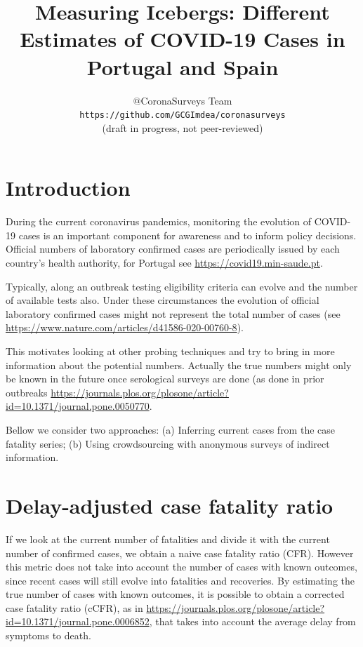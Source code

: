 \documentclass{article}
\begin{document}
\title{Measuring Icebergs: Different Estimates of COVID-19 Cases in Portugal and Spain}
\author{$@$CoronaSurveys Team \\ \texttt{https://github.com/GCGImdea/coronasurveys}\\(draft in progress, not peer-reviewed)}
\maketitle
\section{Introduction}

During the current coronavirus pandemics, monitoring the evolution of COVID-19 cases is an important component for awareness and to inform policy decisions. 
Official numbers of laboratory confirmed cases are periodically issued by each country's health authority, for Portugal see \url{https://covid19.min-saude.pt}. 

Typically, along an outbreak testing eligibility criteria can evolve and the number of available tests also. Under these circumstances the evolution of official laboratory confirmed cases might not represent the total number of cases (see \url{https://www.nature.com/articles/d41586-020-00760-8}).  

This motivates looking at other probing techniques and try to bring in more information about the potential numbers. Actually the true numbers might only be known in the future once serological surveys are done (as done in prior outbreaks \url{https://journals.plos.org/plosone/article?id=10.1371/journal.pone.0050770}.

Bellow we consider two approaches: (a) Inferring current cases from the case fatality series; (b) Using crowdsourcing with anonymous surveys of indirect information.  

\section{Delay-adjusted case fatality ratio}

If we look at the current number of fatalities and divide it with the current number of confirmed cases, we obtain a naive case fatality ratio (CFR). However this metric does not take into account the number of cases with known outcomes, since recent cases will still evolve into fatalities and recoveries. By estimating the true number of cases with known outcomes, it is possible to obtain a corrected case fatality ratio (cCFR), as in \url{https://journals.plos.org/plosone/article?id=10.1371/journal.pone.0006852}, that takes into account the average delay from symptoms to death.  
\end{document}
